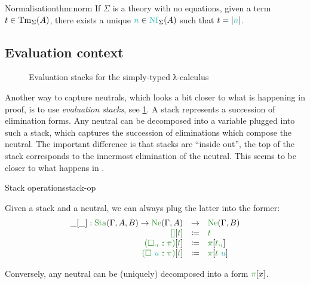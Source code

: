 \documentclass[10pt,a4paper]{notes-template}
\begin{document}
\begin{theorem}{Normalisation}{thm:norm}
  If \(\Sigma\) is a theory with no equations,
  given a term \(t \in \operatorname{Tm}_{\Sigma}(A)\), there exists
  a unique \(\ccol{n} \in \Nf_{\Sigma}(A)\) such that \(t = \eras{\ccol{n}}\).
\end{theorem}

\subsection{Evaluation context}

\begin{figure}
\caption{Evaluation stacks for the simply-typed λ-calculus}
\label{fig:stack}

\end{figure}

Another way to capture neutrals, which looks a bit closer to what is happening
in  proof, is to use \emph{evaluation stacks},
see \cref{fig:stack}.
A stack represents a succession of elimination forms. Any neutral
can be decomposed into a variable plugged into such a stack, which captures
the succession of eliminations which compose the neutral. The important
difference is that stacks are “inside out”, \ie the top of the stack corresponds
to the innermost elimination of the neutral. This seems to be closer to what
happens in \textcite{Cubric1994}.

\begin{definition}{Stack operations}{stack-op}

Given a stack and a neutral, we can always plug the latter into the former:
\[\begin{array}{rcl}
\plug{\_}{\_} \ty \Sta(\Gamma,A,B) \to \Ne(\Gamma,A) &\to & \Ne(\Gamma,B) \\
\plug{\icol{\snil}}{\icol{t}} &\coloneq & \icol{t} \\
\plug{\icol{(\sproj{i} \scons \pi)}}{\icol{t}} &\coloneq &
  \plug{\icol{\pi}}{\icol{\proj{i}{t}}} \\
\plug{\icol{(\sapp{\ccol{u}} \scons \pi)}}{\icol{t}} &\coloneq &
  \plug{\icol{\pi}}{\icol{t~\ccol{u}}} 
\end{array}\]

Conversely, any neutral can be (uniquely) decomposed into a form
\(\plug{\icol{\pi}}{x}\).

\end{definition}
\end{document}
